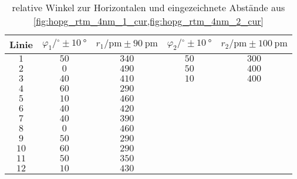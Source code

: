 \begin{table}[htbp]
   \centering
\caption{relative Winkel zur Horizontalen und eingezeichnete Abstände aus \cref{fig:hopg_rtm_4nm_1_cur,fig:hopg_rtm_4nm_2_cur}}
\begin{tabular}{c c c c c}
\hline Linie & $\varphi_1 / {}^\circ\pm \SI{10}{\degree}$ & $r_1/\unit{\pm} \pm \SI{90}{\pm}$ & $\varphi_2 / {}^\circ\pm \SI{10}{\degree}$ & $r_2/\unit{\pm} \pm \SI{100}{\pm}$ \\ 
\hline
$\num{1}$ & $\num{50}$ & $\num{340}$ & $\num{50}$ & $\num{300}$ \\
$\num{2}$ & $\num{0}$ & $\num{490}$ & $\num{50}$ & $\num{400}$ \\
$\num{3}$ & $\num{40}$ & $\num{410}$ & $\num{10}$ & $\num{400}$ \\
$\num{4}$ & $\num{60}$ & $\num{290}$ &    &    \\
$\num{5}$ & $\num{10}$ & $\num{460}$ &    &    \\
$\num{6}$ & $\num{40}$ & $\num{420}$ &    &    \\
$\num{7}$ & $\num{40}$ & $\num{390}$ &    &    \\
$\num{8}$ & $\num{0}$ & $\num{460}$ &    &    \\
$\num{9}$ & $\num{50}$ & $\num{290}$ &    &    \\
$\num{10}$ & $\num{60}$ & $\num{290}$ &    &    \\
$\num{11}$ & $\num{50}$ & $\num{350}$ &    &    \\
$\num{12}$ & $\num{10}$ & $\num{430}$ &    &    \\
\hline\end{tabular}
\label{tab:atomabstand}
\end{table}